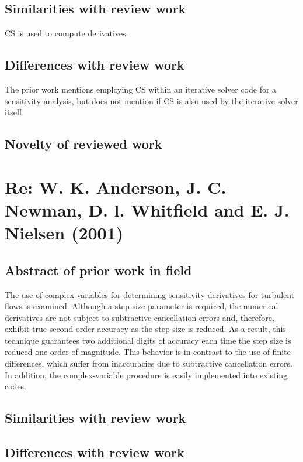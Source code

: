 \documentclass[10pt,letterpaper,draft]{article}
\begin{document}
\subsection{Similarities with review work}

CS is used to compute derivatives.

\subsection{Differences with review work}

The prior work mentions employing CS within an iterative solver code for a sensitivity analysis, but
does not mention if CS is also used by the iterative solver itself. 

\subsection{Novelty of reviewed work}

\section{Re: W. K. Anderson, J. C. Newman, D. l. Whitfield and E. J. Nielsen (2001)}
\subsection{Abstract of prior work in field}

The use of complex variables for determining sensitivity derivatives for
turbulent flows is examined. Although a step size parameter is required, the
numerical derivatives are not subject to subtractive cancellation errors and,
therefore, exhibit true second-order accuracy as the step size is reduced. As a
result, this technique guarantees two additional digits of accuracy each time
the step size is reduced one order of magnitude. This behavior is in contrast
to the use of finite differences, which suffer from inaccuracies due to
subtractive cancellation errors. In addition, the complex-variable procedure is
easily implemented into existing codes.

\subsection{Similarities with review work}
\subsection{Differences with review work}
\end{document}
